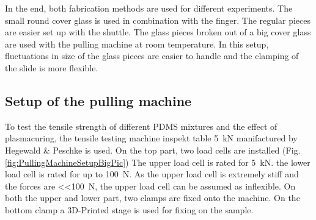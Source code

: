 In the end, both fabrication methods are used for different experiments. The small round cover glass is used in combination with the finger. The regular pieces are easier set up with the shuttle. The glass pieces broken out of a big cover glass are used with the pulling machine at room temperature. In this setup, fluctuations in size of the glass pieces are easier to handle and the clamping of the slide is more flexible. %

\subsection{Setup of the pulling machine}

To test the tensile strength of different PDMS mixtures and the effect of plasmacuring, the tensile testing machine inspekt table \SI{5}{\kilo\newton} manifactured by Hegewald \& Peschke is used. On the top part, two load cells are installed (Fig. \ref{fig:PullingMachineSetupBigPic}) The upper load cell is rated for \SI{5}{\kilo\newton}. the lower load cell is rated for up to \SI{100}{\newton}. As the upper load cell is extremely stiff and the forces are \SI{<<100}{\newton}, the upper load cell can be assumed as inflexible. On both the upper and lower part, two clamps are fixed onto the machine. On the bottom clamp a 3D-Printed stage is used for fixing on the sample.


